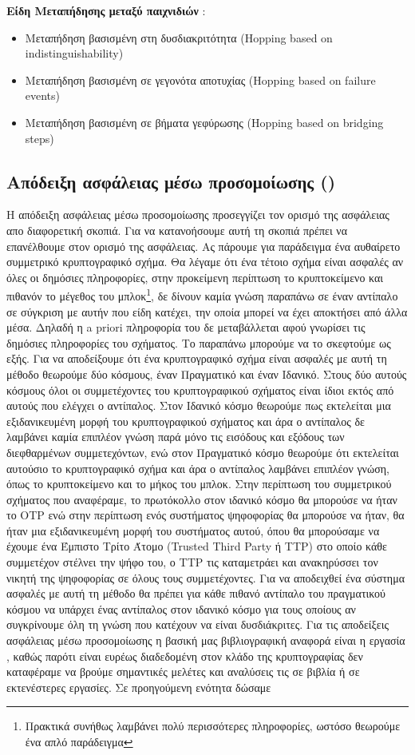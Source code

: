 \textbf{Είδη Μεταπήδησης μεταξύ παιχνιδιών} :
\begin{itemize}
    \item Μεταπήδηση βασισμένη στη δυσδιακριτότητα (Hopping based on indistinguishability)
    \item Μεταπήδηση βασισμένη σε γεγονότα αποτυχίας (Hopping based on failure events)
    \item Μεταπήδηση βασισμένη σε βήματα γεφύρωσης (Hopping based on bridging steps)
\end{itemize}


\subsection{Απόδειξη ασφάλειας μέσω προσομοίωσης ()}
Η απόδειξη ασφάλειας μέσω προσομοίωσης προσεγγίζει τον ορισμό της ασφάλειας απο διαφορετική σκοπιά. Για να κατανοήσουμε αυτή τη σκοπιά πρέπει να επανέλθουμε στον ορισμό της ασφάλειας. Ας πάρουμε για παράδειγμα ένα αυθαίρετο συμμετρικό κρυπτογραφικό σχήμα. Θα λέγαμε ότι ένα τέτοιο σχήμα είναι ασφαλές αν όλες οι δημόσιες πληροφορίες, στην προκείμενη περίπτωση το κρυπτοκείμενο και πιθανόν το μέγεθος του μπλοκ\footnote{Πρακτικά συνήθως λαμβάνει πολύ περισσότερες πληροφορίες, ωστόσο θεωρούμε ένα απλό παράδειγμα}, δε δίνουν καμία γνώση παραπάνω σε έναν αντίπαλο σε σύγκριση με αυτήν που είδη κατέχει, την οποία μπορεί να έχει αποκτήσει από άλλα μέσα. Δηλαδή η a priori πληροφορία του δε μεταβάλλεται αφού γνωρίσει τις δημόσιες πληροφορίες του σχήματος. Το παραπάνω μπορούμε να το σκεφτούμε ως εξής. Για να αποδείξουμε ότι ένα κρυπτογραφικό σχήμα είναι ασφαλές με αυτή τη μέθοδο θεωρούμε δύο κόσμους, έναν Πραγματικό και έναν Ιδανικό. Στους δύο αυτούς κόσμους όλοι οι συμμετέχοντες του κρυπτογραφικού σχήματος είναι ίδιοι εκτός από αυτούς που ελέγχει ο αντίπαλος. Στον Ιδανικό κόσμο θεωρούμε πως εκτελείται μια εξιδανικευμένη μορφή του κρυπτογραφικού σχήματος και άρα ο αντίπαλος δε λαμβάνει καμία επιπλέον γνώση παρά μόνο τις εισόδους και εξόδους των διεφθαρμένων συμμετεχόντων, ενώ στον Πραγματικό κόσμο θεωρούμε ότι εκτελείται αυτούσιο το κρυπτογραφικό σχήμα και άρα ο αντίπαλος λαμβάνει επιπλέον γνώση, όπως το κρυπτοκείμενο και το μήκος του μπλοκ. Στην περίπτωση του συμμετρικού σχήματος που αναφέραμε, το πρωτόκολλο στον ιδανικό κόσμο θα μπορούσε να ήταν το OTP ενώ στην περίπτωση ενός συστήματος ψηφοφορίας θα μπορούσε να ήταν, θα ήταν μια εξιδανικευμένη μορφή του συστήματος αυτού, όπου θα μπορούσαμε να έχουμε ένα Έμπιστο Τρίτο Άτομο (Trusted Third Party ή TTP) στο οποίο κάθε συμμετέχον στέλνει την ψήφο του, ο TTP τις καταμετράει και ανακηρύσσει τον νικητή της ψηφοφορίας σε όλους τους συμμετέχοντες. Για να αποδειχθεί ένα σύστημα ασφαλές με αυτή τη μέθοδο θα πρέπει για κάθε πιθανό αντίπαλο του πραγματικού κόσμου να υπάρχει ένας αντίπαλος στον ιδανικό κόσμο για τους οποίους αν συγκρίνουμε όλη τη γνώση που κατέχουν να είναι δυσδιάκριτες. Για τις αποδείξεις ασφάλειας μέσω προσομοίωσης η βασική μας βιβλιογραφική αναφορά είναι η εργασία \cite{cryptoeprint:2016/046}, καθώς παρότι είναι ευρέως διαδεδομένη στον κλάδο της κρυπτογραφίας δεν καταφέραμε να βρούμε σημαντικές μελέτες και αναλύσεις τις σε βιβλία ή σε εκτενέστερες εργασίες. Σε προηγούμενη ενότητα δώσαμε 